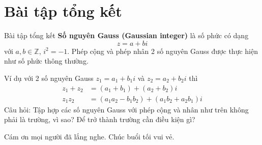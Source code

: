 \documentclass{beamer}
\begin{document}
\section{Bài tập tổng kết}
\begin{frame}{Bài tập tổng kết}
    \textbf{Số nguyên Gauss (Gaussian integer)} là số phức có dạng $$z = a + bi$$ với $a, b \in \mathbb{Z}$, $i^2 = -1$. Phép cộng và phép nhân 2 số nguyên Gauss được thực hiện như số phức thông thường.
    
    Ví dụ với 2 số nguyên Gauss $z_1 = a_1 + b_1 i$ và $z_2 = a_2 + b_2 i$ thì
    \begin{align*}
        z_1 + z_2 & = (a_1 + b_1) + (a_2 + b_2) i \\
        z_1 z_2 & = (a_1 a_2 - b_1 b_2) + (a_1 b_2 + a_2 b_1)i
    \end{align*}
    Câu hỏi: Tập hợp các số nguyên Gauss với phép cộng và nhân như trên không phải là trường, vì sao? Để trở thành trường cần điều kiện gì?
\end{frame}

\begin{frame}
    \begin{center}
        \Huge
        Cám ơn mọi người đã lắng nghe. Chúc buổi tối vui vẻ.
    \end{center}
\end{frame}
\end{document}
